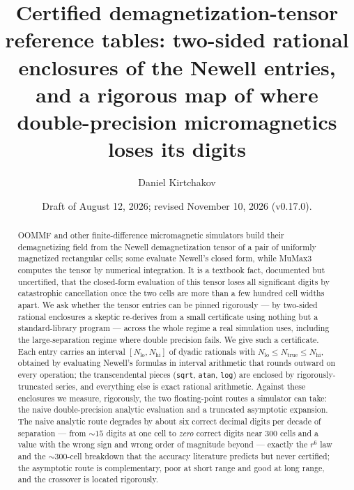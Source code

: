 \documentclass[11pt]{amsart}
\theoremstyle{plain}
\theoremstyle{definition}
\theoremstyle{remark}
\begin{document}
\title[Certified Newell demagnetization-tensor tables]{Certified
demagnetization-tensor reference tables: two-sided rational enclosures of the
Newell entries, and a rigorous map of where double-precision micromagnetics
loses its digits}

\author{Daniel Kirtchakov}
\address{Independent researcher (\texttt{05oz}), Half Ounce Research; no
institutional affiliation. ORCID 0009-0009-5213-4098.
\texttt{daniel@halfounce.io} $\cdot$ \texttt{https://halfounce.io}}

\date{Draft of August 12, 2026; revised November 10, 2026 (v0.17.0).}

\begin{abstract}
OOMMF and other finite-difference micromagnetic simulators build their
demagnetizing field from the Newell demagnetization tensor of a pair of uniformly
magnetized rectangular cells; some evaluate Newell's closed form, while MuMax3
computes the tensor by numerical integration. It is a textbook fact, documented but
uncertified, that the closed-form evaluation of this tensor loses all
significant digits by catastrophic cancellation once the two cells are more
than a few hundred cell widths apart. We ask whether the tensor entries can be
pinned rigorously --- by two-sided rational enclosures a skeptic re-derives from
a small certificate using nothing but a standard-library program --- across the
whole regime a real simulation uses, including the large-separation regime
where double precision fails. We give such a certificate. Each entry carries an
interval $[N_{\mathrm{lo}},N_{\mathrm{hi}}]$ of dyadic rationals with
$N_{\mathrm{lo}}\le N_{\mathrm{true}}\le N_{\mathrm{hi}}$, obtained by
evaluating Newell's formulas in interval arithmetic that rounds outward on every
operation; the transcendental pieces (\texttt{sqrt}, \texttt{atan},
\texttt{log}) are enclosed by rigorously-truncated series, and everything else
is exact rational arithmetic. Against these enclosures we measure, rigorously,
the two floating-point routes a simulator can take: the naive double-precision
analytic evaluation and a truncated asymptotic expansion. The naive analytic route
degrades by about six correct decimal digits per decade of separation --- from
$\sim\!15$ digits at one cell to \emph{zero} correct digits near $300$ cells and
a value with the wrong sign and wrong order of magnitude beyond --- exactly the
$r^{6}$ law and the $\sim\!300$-cell breakdown that the accuracy literature
predicts but never certified; the asymptotic route is complementary, poor at
short range and good at long range, and the crossover is located rigorously.

\end{abstract}
\end{document}
